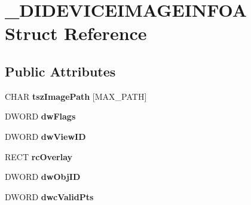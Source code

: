 \hypertarget{struct___d_i_d_e_v_i_c_e_i_m_a_g_e_i_n_f_o_a}{\section{\-\_\-\-D\-I\-D\-E\-V\-I\-C\-E\-I\-M\-A\-G\-E\-I\-N\-F\-O\-A Struct Reference}
\label{struct___d_i_d_e_v_i_c_e_i_m_a_g_e_i_n_f_o_a}
}
\subsection*{Public Attributes}
\begin{DoxyCompactItemize}
\item 
\hypertarget{struct___d_i_d_e_v_i_c_e_i_m_a_g_e_i_n_f_o_a_a34d1d8745b65509c3a8fc2667f2465e2}{C\-H\-A\-R {\bfseries tsz\-Image\-Path} \mbox{[}M\-A\-X\-\_\-\-P\-A\-T\-H\mbox{]}}\label{struct___d_i_d_e_v_i_c_e_i_m_a_g_e_i_n_f_o_a_a34d1d8745b65509c3a8fc2667f2465e2}

\item 
\hypertarget{struct___d_i_d_e_v_i_c_e_i_m_a_g_e_i_n_f_o_a_af0437c16afc64ee64b98b238b2fb45b0}{D\-W\-O\-R\-D {\bfseries dw\-Flags}}\label{struct___d_i_d_e_v_i_c_e_i_m_a_g_e_i_n_f_o_a_af0437c16afc64ee64b98b238b2fb45b0}

\item 
\hypertarget{struct___d_i_d_e_v_i_c_e_i_m_a_g_e_i_n_f_o_a_a92ccae5864a5fc90c436ad1283451275}{D\-W\-O\-R\-D {\bfseries dw\-View\-I\-D}}\label{struct___d_i_d_e_v_i_c_e_i_m_a_g_e_i_n_f_o_a_a92ccae5864a5fc90c436ad1283451275}

\item 
\hypertarget{struct___d_i_d_e_v_i_c_e_i_m_a_g_e_i_n_f_o_a_a7772cf69142ae9e20c40344bc944fd17}{R\-E\-C\-T {\bfseries rc\-Overlay}}\label{struct___d_i_d_e_v_i_c_e_i_m_a_g_e_i_n_f_o_a_a7772cf69142ae9e20c40344bc944fd17}

\item 
\hypertarget{struct___d_i_d_e_v_i_c_e_i_m_a_g_e_i_n_f_o_a_ad5edd4b03c80e9a940fab0641683d29c}{D\-W\-O\-R\-D {\bfseries dw\-Obj\-I\-D}}\label{struct___d_i_d_e_v_i_c_e_i_m_a_g_e_i_n_f_o_a_ad5edd4b03c80e9a940fab0641683d29c}

\item 
\hypertarget{struct___d_i_d_e_v_i_c_e_i_m_a_g_e_i_n_f_o_a_a4a6b8186fd30a70a4be640b4e66cf7b9}{D\-W\-O\-R\-D {\bfseries dwc\-Valid\-Pts}}\label{struct___d_i_d_e_v_i_c_e_i_m_a_g_e_i_n_f_o_a_a4a6b8186fd30a70a4be640b4e66cf7b9}


\end{DoxyCompactItemize}
